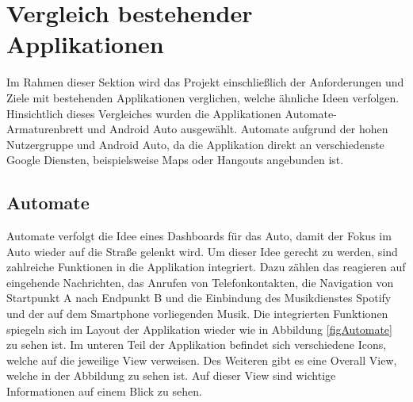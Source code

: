 \section{Vergleich bestehender Applikationen}
Im Rahmen dieser Sektion wird das Projekt einschließlich der Anforderungen und Ziele mit bestehenden Applikationen verglichen, welche ähnliche Ideen verfolgen. Hinsichtlich dieses Vergleiches wurden die Applikationen Automate-Armaturenbrett und Android Auto ausgewählt. Automate aufgrund der hohen Nutzergruppe und Android Auto, da die Applikation direkt an verschiedenste Google Diensten, beispielsweise Maps oder Hangouts angebunden ist. 
\subsection{Automate}
Automate verfolgt die Idee eines Dashboards für das Auto, damit der Fokus im Auto wieder auf die Straße gelenkt wird. Um dieser Idee gerecht zu werden, sind zahlreiche Funktionen in die Applikation integriert. Dazu zählen das reagieren auf eingehende Nachrichten, das Anrufen von Telefonkontakten, die Navigation von Startpunkt A nach Endpunkt B und die Einbindung des Musikdienstes Spotify und der auf dem Smartphone vorliegenden Musik.
Die integrierten Funktionen spiegeln sich im Layout der Applikation wieder wie in Abbildung \ref{figAutomate} zu sehen ist. Im unteren Teil der Applikation befindet sich verschiedene Icons, welche auf die jeweilige View verweisen. Des Weiteren gibt es eine Overall View, welche in der Abbildung zu sehen ist. Auf dieser View sind wichtige Informationen auf einem Blick zu sehen.
